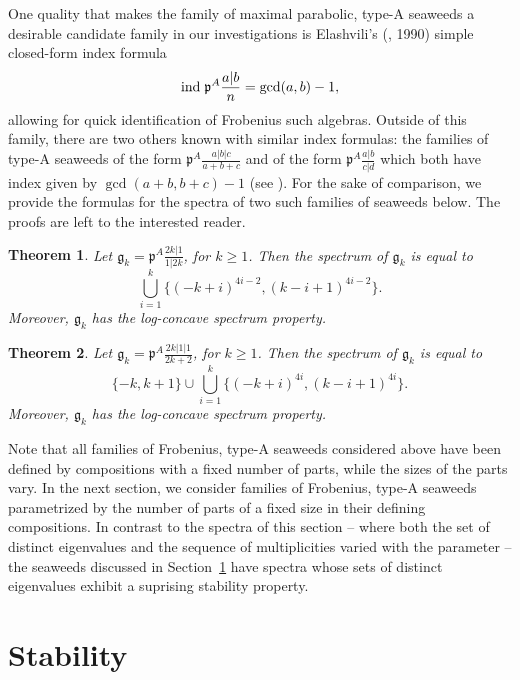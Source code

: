 \documentclass[letterpaper,10pt]{article}
\newtheorem{theorem}{Theorem}
\newcommand{\ind}{{\rm ind \hspace{.1cm}}}
\begin{document}
One quality that makes the family of maximal parabolic, type-A seaweeds a desirable candidate family in our investigations is Elashvili's (\textbf{\cite{Elashvili}}, 1990) simple closed-form index formula $$\ind\mathfrak{p}^A\frac{a|b}{n}=\gcd(a,b)-1,$$ allowing for quick identification of Frobenius such algebras. Outside of this family, there are two others known with similar index formulas: the families of type-A seaweeds of the form $\mathfrak{p}^A\frac{a|b|c}{a+b+c}$ and of the form $\mathfrak{p}^A\frac{a|b}{c|d}$ which both have index given by $\gcd(a+b,b+c)-1$ (see \textbf{\cite{meanders2}}). For the sake of comparison, we provide the formulas for the spectra of two such families of seaweeds below. The proofs are left to the interested reader.

\begin{theorem}\label{thm:2k1/12k}
Let $\mathfrak{g}_k=\mathfrak{p}^A\frac{2k|1}{1|2k}$, for $k\ge 1$. Then the spectrum of $\mathfrak{g}_k$ is equal to 
$$\bigcup_{i=1}^k\{(-k+i)^{4i-2},(k-i+1)^{4i-2}\}.$$ Moreover, $\mathfrak{g}_k$ has the log-concave spectrum property.
\end{theorem}

\begin{theorem}\label{thm:2k11/2k2}
Let $\mathfrak{g}_k=\mathfrak{p}^A\frac{2k|1|1}{2k+2}$, for $k\ge 1$. Then the spectrum of $\mathfrak{g}_k$ is equal to $$\{-k,k+1\}\cup\bigcup_{i=1}^k\{(-k+i)^{4i},(k-i+1)^{4i}\}.$$ Moreover, $\mathfrak{g}_k$ has the log-concave spectrum property.
\end{theorem}

Note that all families of Frobenius, type-A seaweeds considered above have been defined by compositions with a fixed number of parts, while the sizes of the parts vary. In the next section, we consider families of Frobenius, type-A seaweeds parametrized by the number of parts of a fixed size in their defining compositions. In contrast to the spectra of this section -- where both the set of distinct eigenvalues and the sequence of multiplicities varied with the parameter -- the seaweeds discussed in Section~\ref{sec:stable} have spectra whose sets of distinct eigenvalues exhibit a suprising stability property.






\section{Stability}\label{sec:stable}
\end{document}
